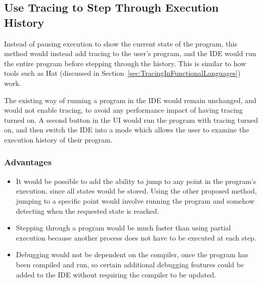 \documentclass[authoryearcitations]{UoYCSproject}
\begin{document}

\subsection{Use Tracing to Step Through Execution History}
\label{sec:ProposedDesign2}

Instead of pausing execution to show the current state of the program, this
method would instead add tracing to the user's program, and the IDE would run
the entire program before stepping through the history. This is similar to how
tools such as Hat (discussed in Section~\ref{sec:TracingInFunctionalLanguages})
work.

The existing way of running a program in the IDE would remain unchanged, and
would not enable tracing, to avoid any performance impact of having tracing
turned on. A second button in the UI would run the program with tracing turned
on, and then switch the IDE into a mode which allows the user to examine the
execution history of their program.


\subsubsection{Advantages}
\label{sec:ProposedDesign2Advantages}

\begin{itemize}
    \item It would be possible to add the ability to jump to any point in the
          program's execution, since all states would be stored. Using the other
          proposed method, jumping to a specific point would involve running the
          program and somehow detecting when the requested state is reached.

    \item Stepping through a program would be much faster than using partial
          execution because another process does not have to be executed at each
          step.

    \item Debugging would not be dependent on the compiler, once the program has
          been compiled and run, so certain additional debugging features could
          be added to the IDE without requiring the compiler to be updated. 
\end{itemize}
\end{document}

